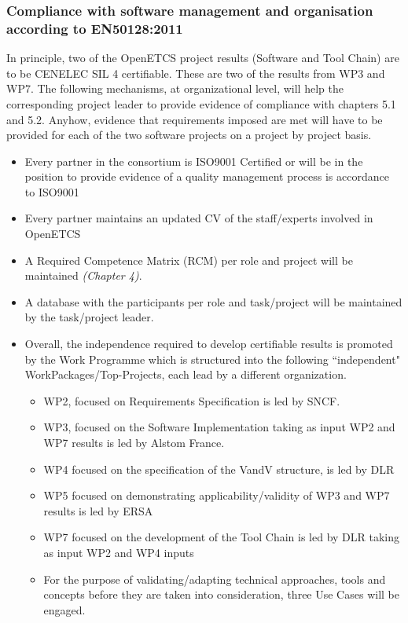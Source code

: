 \documentclass{template/openetcs_article}
\begin{document}
\subsubsection{Compliance with software management and organisation according to EN50128:2011}
In principle, two of the OpenETCS project results (Software and Tool Chain) are to be CENELEC \gls{SIL} 4 certifiable. These are two of the results from WP3 and WP7. The following mechanisms, at organizational level, will help the corresponding project leader to provide evidence of compliance with chapters 5.1 and 5.2. Anyhow, evidence that requirements imposed are met will have to be provided for each of the two software projects on a project by project basis. 

\begin{itemize}
\item Every partner in the consortium is ISO9001 Certified or will be in the position to provide evidence of a quality management process is accordance to ISO9001
\item Every partner maintains an updated CV of the staff/experts involved in OpenETCS
\item A Required Competence Matrix (RCM) per role and project will be maintained \textit{(Chapter 4)}.
\item A database with the participants per role and task/project will be maintained by the task/project leader.
\item Overall, the independence required to develop certifiable results is promoted by the Work Programme which is structured into the following “independent" WorkPackages/Top-Projects, each lead by a different organization.  
\begin{itemize}
\item WP2, focused on Requirements Specification is led by SNCF.
\item WP3, focused on the Software Implementation taking as input WP2 and WP7 results is led by Alstom France.
\item WP4 focused on the specification of the \gls{VandV} structure, is led by DLR
\item WP5 focused on demonstrating applicability/validity of WP3 and WP7 results is led by ERSA
\item WP7 focused on the development of the Tool Chain is led by DLR taking as input WP2 and WP4 inputs
\item For the purpose of validating/adapting technical approaches, tools and concepts before they are taken into consideration, three Use Cases will be engaged.

\end{itemize}
\end{itemize}
\end{document}
